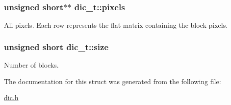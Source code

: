 \subsubsection[{pixels}]{\setlength{\rightskip}{0pt plus 5cm}unsigned short$\ast$$\ast$ dic\+\_\+t\+::pixels}\label{structdic__t_ab196d2cfe35a58fb137dd8ab366389dd}
All pixels. Each row represents the flat matrix containing the block pixels. \hypertarget{structdic__t_a5b7a90222befc84c0bb74f31d6df418f}{}
\subsubsection[{size}]{\setlength{\rightskip}{0pt plus 5cm}unsigned short dic\+\_\+t\+::size}\label{structdic__t_a5b7a90222befc84c0bb74f31d6df418f}
Number of blocks. 

The documentation for this struct was generated from the following file\+:\begin{DoxyCompactItemize}
\item 
\hyperlink{dic_8h}{dic.\+h}\end{DoxyCompactItemize}
